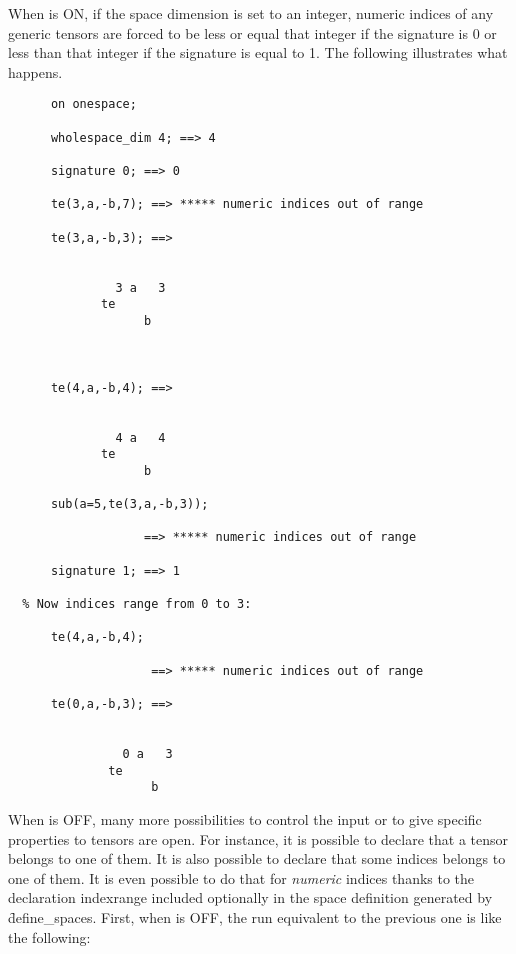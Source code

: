 When  is ON, if the space dimension is set to an integer, numeric
indices of any generic tensors are forced to be less or equal that integer
if the signature is 0 or less than that integer if the signature is equal to 1.
The following illustrates what happens.
\begin{verbatim}
      on onespace;

      wholespace_dim 4; ==> 4

      signature 0; ==> 0

      te(3,a,-b,7); ==> ***** numeric indices out of range

      te(3,a,-b,3); ==>


               3 a   3
             te
                   b



      te(4,a,-b,4); ==>


               4 a   4
             te
                   b

      sub(a=5,te(3,a,-b,3));

                   ==> ***** numeric indices out of range

      signature 1; ==> 1

  % Now indices range from 0 to 3:

      te(4,a,-b,4);

                    ==> ***** numeric indices out of range

      te(0,a,-b,3); ==>


                0 a   3
              te
                    b
\end{verbatim}
When  is OFF,
many more possibilities to control the input or to
give specific properties to tensors are open.
For instance, it is possible to declare that a tensor belongs
to one of them. It is also possible to declare that some indices
belongs to one of them.  It is even possible to do that
for \emph{numeric} indices thanks to the declaration
indexrange
included optionally in the space definition generated by
\f{define\_spaces}.
First, when  is OFF, the run equivalent to the previous one is
like the following:
